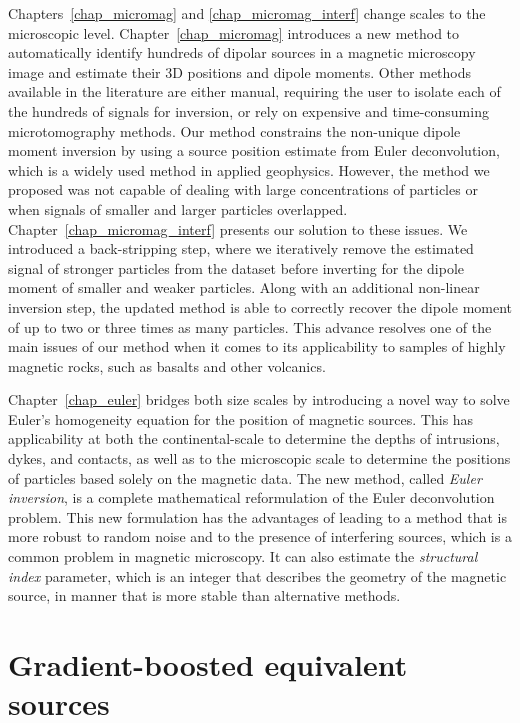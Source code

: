 \documentclass[10pt,a4paper,oneside]{book}
\begin{document}
Chapters~\ref{chap_micromag} and \ref{chap_micromag_interf} change scales to
the microscopic level.
Chapter~\ref{chap_micromag} introduces a new method to automatically identify
hundreds of dipolar sources in a magnetic microscopy image and estimate their
3D positions and dipole moments.
Other methods available in the literature are either manual, requiring the user
to isolate each of the hundreds of signals for inversion, or rely on expensive
and time-consuming microtomography methods.
Our method constrains the non-unique dipole moment inversion by using a source
position estimate from Euler deconvolution, which is a widely used method in
applied geophysics.
However, the method we proposed was not capable of dealing with large
concentrations of particles or when signals of smaller and larger particles
overlapped.
Chapter~\ref{chap_micromag_interf} presents our solution to these issues.
We introduced a back-stripping step, where we iteratively remove the estimated
signal of stronger particles from the dataset before inverting for the dipole
moment of smaller and weaker particles.
Along with an additional non-linear inversion step, the updated method is able
to correctly recover the dipole moment of up to two or three times as many
particles.
This advance resolves one of the main issues of our method when it comes to its
applicability to samples of highly magnetic rocks, such as basalts and other
volcanics.

Chapter~\ref{chap_euler} bridges both size scales by introducing a novel way to
solve Euler's homogeneity equation for the position of magnetic sources.
This has applicability at both the continental-scale to determine the depths of
intrusions, dykes, and contacts, as well as to the microscopic scale to
determine the positions of particles based solely on the magnetic data.
The new method, called \textit{Euler inversion}, is a complete mathematical
reformulation of the Euler deconvolution problem.
This new formulation has the advantages of leading to a method that is more
robust to random noise and to the presence of interfering sources, which is
a common problem in magnetic microscopy.
It can also estimate the \textit{structural index} parameter, which is an
integer that describes the geometry of the magnetic source, in manner that is
more stable than alternative methods.


\chapter{Gradient-boosted equivalent sources}
\label{chap_eqsgb}
\end{document}
